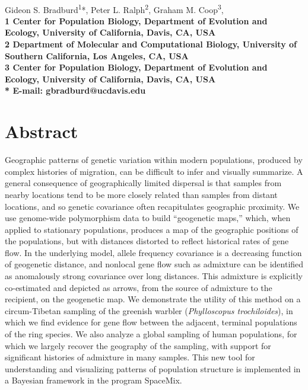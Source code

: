 \documentclass[10pt,letterpaper]{article}
\date{}
\begin{document}
\vspace*{0.35in}

\begin{flushleft}
{\Large
\textbf{}
}
\newline
\\
Gideon S. Bradburd\textsuperscript{1}*,
Peter L. Ralph\textsuperscript{2},
Graham M. Coop\textsuperscript{3},
\\
\bf{1} Center for Population Biology, Department of Evolution and Ecology, University of California, Davis, CA, USA
\\
\bf{2} Department of Molecular and Computational Biology, University of Southern California, Los Angeles, CA, USA
\\
\bf{3} Center for Population Biology, Department of Evolution and Ecology, University of California, Davis, CA, USA
\\

% 
%

* E-mail: gbradburd@ucdavis.edu
\end{flushleft}
\section*{Abstract}
Geographic patterns of genetic variation within modern populations, 
produced by complex histories of migration, 
can be difficult to infer and visually summarize. 
A general consequence of geographically limited dispersal 
is that samples from nearby locations tend to be more closely related than samples from distant locations, 
and so genetic covariance often recapitulates geographic proximity.  
We use genome-wide polymorphism data to build ``geogenetic maps,'' 
which, when applied to stationary populations, 
produces a map of the geographic positions of the populations, 
but with distances distorted to reflect historical rates of gene flow.  
In the underlying model, allele frequency covariance is a decreasing function of geogenetic distance, 
and nonlocal gene flow such as admixture can be identified as anomalously strong covariance over long distances.  
This admixture is explicitly co-estimated and depicted as arrows, 
from the source of admixture to the recipient, on the geogenetic map.  
We demonstrate the utility of this method on a circum-Tibetan sampling of the greenish warbler (\textit{Phylloscopus trochiloides}), 
in which we find evidence for gene flow between the adjacent, terminal populations of the ring species. 
We also analyze a global sampling of human populations, for which we largely recover the geography of the sampling, 
with support for significant histories of admixture in many samples.  
This new tool for understanding and visualizing patterns of population structure 
is implemented in a Bayesian framework in the program SpaceMix.
\end{document}
